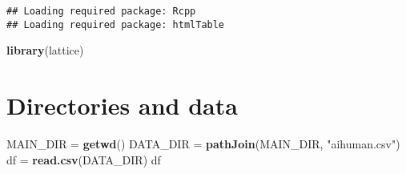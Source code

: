 \documentclass[
]{article}
\newenvironment{Shaded}{\begin{snugshade}}{\end{snugshade}}
\newcommand{\FunctionTok}[1]{\textcolor[rgb]{0.13,0.29,0.53}{\textbf{#1}}}
\newcommand{\NormalTok}[1]{#1}
\newcommand{\OtherTok}[1]{\textcolor[rgb]{0.56,0.35,0.01}{#1}}
\newcommand{\StringTok}[1]{\textcolor[rgb]{0.31,0.60,0.02}{#1}}
\begin{document}
\begin{verbatim}
## Loading required package: Rcpp
## Loading required package: htmlTable
\end{verbatim}

\begin{Shaded}
\begin{Highlighting}[]
\FunctionTok{library}\NormalTok{(lattice)}
\end{Highlighting}
\end{Shaded}

\hypertarget{directories-and-data}{%
\section{Directories and data}\label{directories-and-data}}

\begin{Shaded}
\begin{Highlighting}[]
\NormalTok{MAIN\_DIR }\OtherTok{=} \FunctionTok{getwd}\NormalTok{()}
\NormalTok{DATA\_DIR }\OtherTok{=} \FunctionTok{pathJoin}\NormalTok{(MAIN\_DIR, }\StringTok{"aihuman.csv"}\NormalTok{) }
\NormalTok{df }\OtherTok{=} \FunctionTok{read.csv}\NormalTok{(DATA\_DIR)}
\NormalTok{df}
\end{Highlighting}
\end{Shaded}
\end{document}
